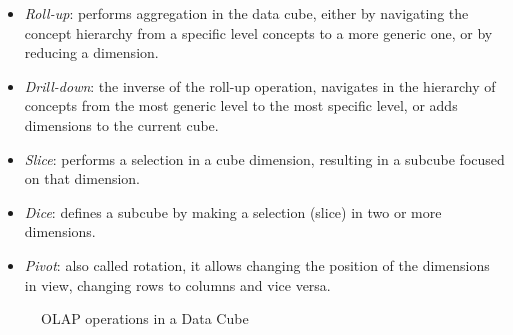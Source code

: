 \begin{itemize}
  \item \textit{Roll-up}: performs aggregation in the data cube, either by navigating the concept hierarchy from a specific level concepts to a more generic one, or by reducing a dimension.
  \item \textit{Drill-down}: the inverse of the roll-up operation, navigates in the hierarchy of concepts from the most generic level to the most specific level, or adds dimensions to the current cube.
  \item \textit{Slice}: performs a selection in a cube dimension, resulting in a subcube focused on that dimension.
  \item \textit{Dice}: defines a subcube by making a selection (slice) in two or more dimensions.
  \item \textit{Pivot}: also called rotation, it allows changing the position of the dimensions in view, changing rows to columns and vice versa.
\end{itemize}

\begin{figure}[!htb]
  \caption{OLAP operations in a Data Cube}\label{fig:olap}
  \vspace{4mm}
  \begin{center}
  \end{center}
  \vspace{2mm}
\end{figure}

